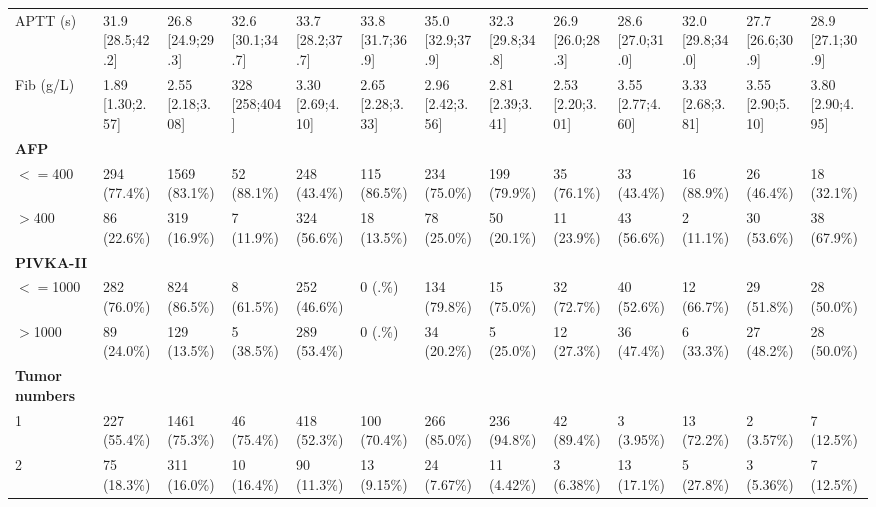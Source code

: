 \documentclass{article}
\begin{document}
\begin{landscape}
\begin{tiny}
\begin{tabularx}{\linewidth}{p{4.5cm}|X|X|X|X|X|X|X|X|X|X|X|X}
\rowcolor{gray!10}
APTT (s) & 31.9 [28.5;42.2] & 26.8 [24.9;29.3] & 32.6 [30.1;34.7] & 33.7 [28.2;37.7] & 33.8 [31.7;36.9] & 35.0 [32.9;37.9] & 32.3 [29.8;34.8] & 26.9 [26.0;28.3] & 28.6 [27.0;31.0] & 32.0 [29.8;34.0] & 27.7 [26.6;30.9] & 28.9 [27.1;30.9] \\
\rowcolor{gray!10}
Fib (g/L) & 1.89 [1.30;2.57] & 2.55 [2.18;3.08] &  328 [258;404]   & 3.30 [2.69;4.10] & 2.65 [2.28;3.33] & 2.96 [2.42;3.56] & 2.81 [2.39;3.41] & 2.53 [2.20;3.01] & 3.55 [2.77;4.60] & 3.33 [2.68;3.81] & 3.55 [2.90;5.10] & 3.80 [2.90;4.95] \\
\rowcolor{gray!30}
\textbf{AFP }  &  &  &  &  &  &  &  &  &  &  &  &  \\
\rowcolor{gray!10}
    $<=$400 &   294 (77.4\%)    &   1569 (83.1\%)   &    52 (88.1\%)    &   248 (43.4\%)    &   115 (86.5\%)    &   234 (75.0\%)    &   199 (79.9\%)    &    35 (76.1\%)    &    33 (43.4\%)    &    16 (88.9\%)    &    26 (46.4\%)    &    18 (32.1\%)    \\
\rowcolor{gray!10}
    $>$400 &    86 (22.6\%)    &   319 (16.9\%)    &    7 (11.9\%)     &   324 (56.6\%)    &    18 (13.5\%)    &    78 (25.0\%)    &    50 (20.1\%)    &    11 (23.9\%)    &    43 (56.6\%)    &    2 (11.1\%)     &    30 (53.6\%)    &    38 (67.9\%)    \\
\rowcolor{gray!30}
\textbf{PIVKA-II }  &  &  &  &  &  &  &  &  &  &  &  &  \\
\rowcolor{gray!10}
    $<=$1000 &   282 (76.0\%)    &   824 (86.5\%)    &    8 (61.5\%)     &   252 (46.6\%)    &      0 (.\%)      &   134 (79.8\%)    &    15 (75.0\%)    &    32 (72.7\%)    &    40 (52.6\%)    &    12 (66.7\%)    &    29 (51.8\%)    &    28 (50.0\%)    \\
\rowcolor{gray!10}
    $>$1000 &    89 (24.0\%)    &   129 (13.5\%)    &    5 (38.5\%)     &   289 (53.4\%)    &      0 (.\%)      &    34 (20.2\%)    &    5 (25.0\%)     &    12 (27.3\%)    &    36 (47.4\%)    &    6 (33.3\%)     &    27 (48.2\%)    &    28 (50.0\%)    \\
\rowcolor{gray!30}
\textbf{Tumor numbers }  &  &  &  &  &  &  &  &  &  &  &  &  \\
\rowcolor{gray!10}
    1 &   227 (55.4\%)    &   1461 (75.3\%)   &    46 (75.4\%)    &   418 (52.3\%)    &   100 (70.4\%)    &   266 (85.0\%)    &   236 (94.8\%)    &    42 (89.4\%)    &    3 (3.95\%)     &    13 (72.2\%)    &    2 (3.57\%)     &    7 (12.5\%)     \\
\rowcolor{gray!10}
    2 &    75 (18.3\%)    &   311 (16.0\%)    &    10 (16.4\%)    &    90 (11.3\%)    &    13 (9.15\%)    &    24 (7.67\%)    &    11 (4.42\%)    &    3 (6.38\%)     &    13 (17.1\%)    &    5 (27.8\%)     &    3 (5.36\%)     &    7 (12.5\%)     \\

\end{tabularx}
\end{tiny}
\end{landscape}
\end{document}
